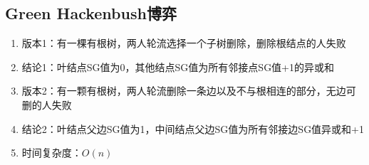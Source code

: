 \documentclass[twocolumn,a4,8pt]{article}  %
\begin{document}
		\subsection{Green Hackenbush博弈}
			\noindent\begin{enumerate}
				\item 版本1：有一棵有根树，两人轮流选择一个子树删除，删除根结点的人失败
				\item 结论1：叶结点SG值为0，其他结点SG值为所有邻接点SG值+1的异或和
				\item 版本2：有一颗有根树，两人轮流删除一条边以及不与根相连的部分，无边可删的人失败
				\item 结论2：叶结点父边SG值为1，中间结点父边SG值为所有邻接边SG值异或和+1
				\item 时间复杂度：$O(n)$
			\end{enumerate}
	 	 	
\end{document}
